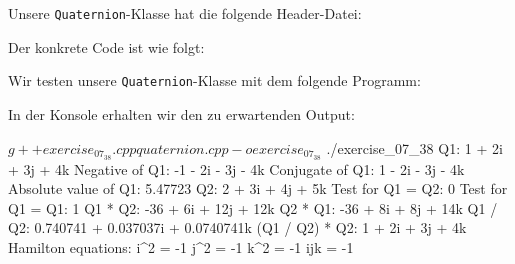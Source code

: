 \section{}

Unsere \texttt{Quaternion}-Klasse hat die folgende Header-Datei:



Der konkrete Code ist wie folgt:



Wir testen unsere \texttt{Quaternion}-Klasse mit dem folgende Programm:



In der Konsole erhalten wir den zu erwartenden Output:

\begin{consoleoutput}
$ g++ exercise_07_38.cpp quaternion.cpp -o exercise_07_38
$ ./exercise_07_38                                       
Q1: 1 + 2i + 3j + 4k
Negative of Q1: -1 - 2i - 3j - 4k
Conjugate of Q1: 1 - 2i - 3j - 4k
Absolute value of Q1: 5.47723
Q2: 2 + 3i + 4j + 5k
Test for Q1 = Q2: 0
Test for Q1 = Q1: 1
Q1 * Q2: -36 + 6i + 12j + 12k
Q2 * Q1: -36 + 8i + 8j + 14k
Q1 / Q2: 0.740741 + 0.037037i + 0.0740741k
(Q1 / Q2) * Q2: 1 + 2i + 3j + 4k
Hamilton equations:
i^2 = -1
j^2 = -1
k^2 = -1
ijk = -1
\end{consoleoutput}

